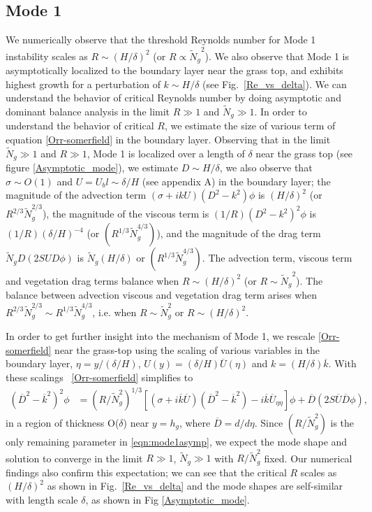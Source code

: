 \documentclass[12pt]{report}   %
\newcommand{\hg}{h_g}
\newcommand{\Rey}{{R}}
\newcommand{\Ndg}{\tilde{N}_g}
\renewcommand{\bar}{\overline}
\begin{document}
\subsection{Mode 1}
We numerically observe that the threshold Reynolds number for Mode 1 instability scales as  $\Rey \sim (H/\delta)^2$ (or $\Rey \propto {\Ndg}^{2}$). We also observe that Mode 1 is asymptotically localized to the boundary layer near the grass top, and exhibits highest growth for a perturbation of $k \sim H/\delta$ (see Fig.~\ref{Re_vs_delta}). We can understand the behavior of critical Reynolds number by doing asymptotic and dominant balance analysis in the limit $\Rey \gg 1$ and $\Ndg \gg 1$. In order to understand the behavior of critical $\Rey$, we estimate the size of various term of equation \ref{Orr-somerfield} in the boundary layer. Observing that in the limit $\Ndg \gg 1$ and $\Rey \gg 1$, Mode 1 is localized over a length of $\delta$ near the grass top (see figure \ref{Asymptotic_mode}), we estimate $D \sim H/\delta$, we also observe that $\sigma \sim O(1)$ and $U = U_bl \sim \delta/H$ (see appendix A) in the boundary layer; the magnitude of the advection term $\left(\sigma + i k U\right)\left(D^2-
k^2\right) \phi$ is $ (H/\delta)^2$  (or $\Rey^{2/3} \Ndg^{2/3}$), the magnitude of the viscous term is $(1/\Rey)\left(D^2-k^2\right)^2\phi$ is $(1/\Rey) (\delta/H)^{-4}$ (or $(\Rey^{1/3} \Ndg^{4/3})$), and the magnitude of the drag term $\Ndg D \left( 2 S U D \phi \right)$ is $\Ndg(H/\delta)$ or $(\Rey^{1/3} \Ndg^{4/3})$.
The advection term, viscous term and vegetation drag terms balance when $\Rey \sim (H/\delta)^2$ (or $\Rey \sim {\Ndg}^{2}$). The balance between advection viscous and vegetation drag term arises when $R^{2/3}\Ndg^{2/3}  \sim R^{1/3} \Ndg^{4/3}$, i.e. when $\Rey \sim \Ndg^2$ or $R\sim (H/\delta)^2$. 




In order to get further insight into the mechanism of Mode 1, we rescale \eqref{Orr-somerfield} near the grass-top using the scaling of various variables in the boundary layer, $\eta = y/(\delta/H)$, 
$U(y) = (\delta/H)\bar{U}(\eta)$ and $k = (H/\delta) \bar{k}$.
With these scalings ~\eqref{Orr-somerfield} simplifies to
\begin{equation}
\begin{split}
\left(\bar{D}^2 -\bar{k}^{2} \right)^2\phi &= (\Rey/\Ndg^2)^{1/3} \left[ \left({\sigma}+i\bar{k}\bar{U}\right) \left(\bar{D}^2-\bar{k}^2\right) -i\bar{k}\bar{U}_{\eta\eta}\right]\phi + \bar{D}\left(2S \bar{U} \bar{D} \phi\right),
\label{eqn:mode1asymp}
\end{split}
\end{equation}
in a region of thickness O($\delta$) near $y=\hg$, where $\bar{D} = d/d\eta$. 
Since $(\Rey/\Ndg^2)$ is the only remaining parameter in \eqref{eqn:mode1asymp}, we expect the mode shape and solution to converge in the limit $\Rey \gg 1$, $\Ndg \gg 1$ with $\Rey/\Ndg^2$ fixed.
Our numerical findings also confirm this expectation; we can see that the critical $\Rey$ scales as $(H/\delta)^2$ as shown in Fig.~\ref{Re_vs_delta} and the mode shapes are self-similar with length scale $\delta$, as shown in Fig \ref{Asymptotic_mode}. 
\end{document}
